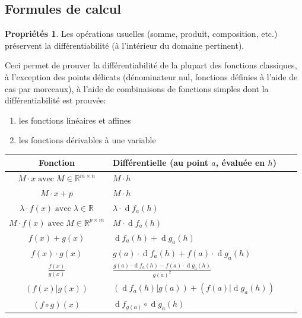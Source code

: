 \documentclass[11pt,a4paper]{article}
\theoremstyle{definition}
\newtheorem{myprop}[mydef]{Propriétés}
\DeclareMathOperator{\diff}{d}
\newcommand{\dif}{\diff\!}
\newcommand{\R}{\mathbb{R}}
\begin{document}
\subsection{Formules de calcul}

\begin{myprop}
	Les opérations usuelles (somme, produit, composition, etc.) préservent la différentiabilité
	(à l'intérieur du domaine pertinent).

	Ceci permet de prouver la différentiabilité de la plupart des fonctions classiques,
	à l'exception des points délicats
	(dénominateur nul, fonctions définies à l'aide de cas par morceaux),
	à l'aide de combinaisons de fonctions simples dont la différentiabilité est prouvée:
	\begin{enumerate}
		\item les fonctions linéaires et affines
		\item les fonctions dérivables à une variable
	\end{enumerate}
\end{myprop}

\noindent
\begin{tabularx}{1.0\textwidth}{|S X|S X|}
	\hline
	Fonction & Différentielle (au point $a$, évaluée en $h$)\\
	\hline
	$ \displaystyle M \cdot x \;\text{avec}\; M \in \R^{m \times n} $ & $\displaystyle M \cdot h $\\
	\hline
	$ \displaystyle M \cdot x + p $ & $\displaystyle  M \cdot h $ \\
	\hline
	$ \lambda \cdot f(x) \;\text{avec}\; \lambda \in \R $ & $\displaystyle \lambda \cdot \dif f_a (h) $ \\
	\hline
	$ \displaystyle M \cdot f(x) \;\text{avec}\; M \in \R^{p \times m}$ & $\displaystyle M \cdot \dif f_a (h)$ \\
	\hline
	$ \displaystyle f(x) + g(x) $ & $ \displaystyle \dif f_a (h) + \dif g_a (h) $ \\
	\hline
	$ \displaystyle f(x)\cdot g(x) $ & $\displaystyle  g(a) \cdot \dif f_a(h) + f(a) \cdot \dif g_a(h) $ \\
	\hline
	$ \displaystyle \frac{f(x)}{g(x)} $ & $\displaystyle  \frac{g(a) \cdot \dif f_a(h) - f(a) \cdot \dif g_a(h) }{g(a)^2} $ \\
	\hline
	$ \displaystyle (f(x)|g(x)) $ & $\displaystyle  (\dif f_a(h) | g(a) ) + (f(a)|\dif g_a(h)) $ \\
	\hline
	$ \displaystyle (f \circ g)(x) $ & $\displaystyle  \dif f_{g(a)} \circ \dif g_a(h) $ \\
	\hline
\end{tabularx}
\end{document}

